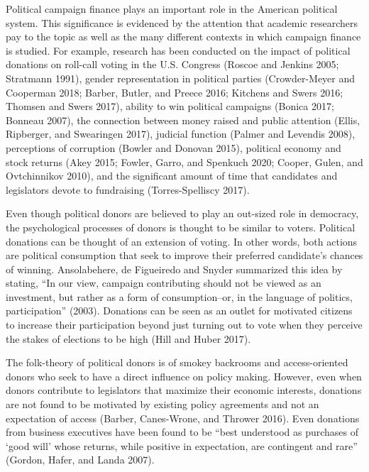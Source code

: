 \documentclass[12pt,]{article}
\begin{document}
\vskip -8.5pt



\noindent \doublespacing 

Political campaign finance plays an important role in the American
political system. This significance is evidenced by the attention that
academic researchers pay to the topic as well as the many different
contexts in which campaign finance is studied. For example, research has
been conducted on the impact of political donations on roll-call voting
in the U.S. Congress (Roscoe and Jenkins 2005; Stratmann 1991), gender
representation in political parties (Crowder-Meyer and Cooperman 2018;
Barber, Butler, and Preece 2016; Kitchens and Swers 2016; Thomsen and
Swers 2017), ability to win political campaigns (Bonica 2017; Bonneau
2007), the connection between money raised and public attention (Ellis,
Ripberger, and Swearingen 2017), judicial function (Palmer and Levendis
2008), perceptions of corruption (Bowler and Donovan 2015), political
economy and stock returns (Akey 2015; Fowler, Garro, and Spenkuch 2020;
Cooper, Gulen, and Ovtchinnikov 2010), and the significant amount of
time that candidates and legislators devote to fundraising
(Torres-Spelliscy 2017).

Even though political donors are believed to play an out-sized role in
democracy, the psychological processes of donors is thought to be
similar to voters. Political donations can be thought of an extension of
voting. In other words, both actions are political consumption that seek
to improve their preferred candidate's chances of winning. Ansolabehere,
de Figueiredo and Snyder summarized this idea by stating, ``In our view,
campaign contributing should not be viewed as an investment, but rather
as a form of consumption--or, in the language of politics,
participation'' (2003). Donations can be seen as an outlet for motivated
citizens to increase their participation beyond just turning out to vote
when they perceive the stakes of elections to be high (Hill and Huber
2017).

The folk-theory of political donors is of smokey backrooms and
access-oriented donors who seek to have a direct influence on policy
making. However, even when donors contribute to legislators that
maximize their economic interests, donations are not found to be
motivated by existing policy agreements and not an expectation of access
(Barber, Canes-Wrone, and Thrower 2016). Even donations from business
executives have been found to be ``best understood as purchases of `good
will' whose returns, while positive in expectation, are contingent and
rare'' (Gordon, Hafer, and Landa 2007).
\end{document}
